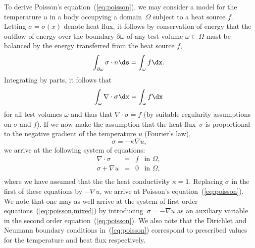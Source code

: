 To derive Poisson's equation~(\ref{eq:poisson}), we may consider a
model for the temperature $u$ in a body occupying a domain~$\Omega$
subject to a heat source $f$. Letting $\sigma = \sigma(x)$ denote heat
flux, it follows by conservation of energy that the outflow of energy
over the boundary $\partial\omega$ of any test volume
$\omega\subset\Omega$ must be balanced by the energy transferred from
the heat source $f$,
\begin{displaymath}
  \int_{\partial\omega} \sigma \cdot n \ds = \int_{\omega} f \dx.
\end{displaymath}
Integrating by parts, it follows that
\begin{displaymath}
  \int_{\omega} \nabla \cdot \sigma \dx = \int_{\omega} f \dx
\end{displaymath}
for all test volumes $\omega$ and thus that $\nabla \cdot \sigma = f$
(by suitable regularity assumptions on $\sigma$ and $f$). If we now
make the assumption that the heat flux~$\sigma$ is proportional to the
negative gradient of the temperature $u$ (Fourier's law),
\begin{displaymath}\
  \sigma = -\kappa \nabla u,
\end{displaymath}
we arrive at
the following system of equations:
\begin{equation} \label{eq:poisson,mixed}
  \begin{array}{rcll}
    \nabla \cdot \sigma &=& f &\mbox{in } \Omega, \\
    \sigma + \nabla u &=& 0   &\mbox{in } \Omega, \\
  \end{array}
\end{equation}
where we have assumed that the the heat conductivity $\kappa = 1$.
Replacing $\sigma$ in the first of these equations by $-\nabla u$, we
arrive at Poisson's equation~(\ref{eq:poisson}). We note that one may
as well arrive at the system of first order
equations~(\ref{eq:poisson,mixed}) by introducing~$\sigma = -\nabla u$
as an auxiliary variable in the second order
equation~(\ref{eq:poisson}). We also note that the Dirichlet and
Neumann boundary conditions in~(\ref{eq:poisson}) correspond to
prescribed values for the temperature and heat flux respectively.

